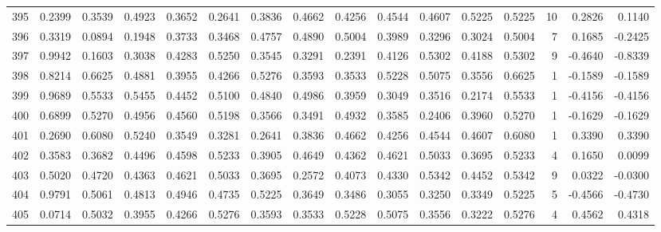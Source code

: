 \begin{tabular}{lrrrrrrrrrrrrrrr}
395 &      0.2399 &  0.3539 &  0.4923 &  0.3652 &  0.2641 &  0.3836 &  0.4662 &  0.4256 &  0.4544 &  0.4607 &   0.5225 &     0.5225 &     10 &                    0.2826 &                     0.1140 \\
396 &      0.3319 &  0.0894 &  0.1948 &  0.3733 &  0.3468 &  0.4757 &  0.4890 &  0.5004 &  0.3989 &  0.3296 &   0.3024 &     0.5004 &      7 &                    0.1685 &                    -0.2425 \\
397 &      0.9942 &  0.1603 &  0.3038 &  0.4283 &  0.5250 &  0.3545 &  0.3291 &  0.2391 &  0.4126 &  0.5302 &   0.4188 &     0.5302 &      9 &                   -0.4640 &                    -0.8339 \\
398 &      0.8214 &  0.6625 &  0.4881 &  0.3955 &  0.4266 &  0.5276 &  0.3593 &  0.3533 &  0.5228 &  0.5075 &   0.3556 &     0.6625 &      1 &                   -0.1589 &                    -0.1589 \\
399 &      0.9689 &  0.5533 &  0.5455 &  0.4452 &  0.5100 &  0.4840 &  0.4986 &  0.3959 &  0.3049 &  0.3516 &   0.2174 &     0.5533 &      1 &                   -0.4156 &                    -0.4156 \\
400 &      0.6899 &  0.5270 &  0.4956 &  0.4560 &  0.5198 &  0.3566 &  0.3491 &  0.4932 &  0.3585 &  0.2406 &   0.3960 &     0.5270 &      1 &                   -0.1629 &                    -0.1629 \\
401 &      0.2690 &  0.6080 &  0.5240 &  0.3549 &  0.3281 &  0.2641 &  0.3836 &  0.4662 &  0.4256 &  0.4544 &   0.4607 &     0.6080 &      1 &                    0.3390 &                     0.3390 \\
402 &      0.3583 &  0.3682 &  0.4496 &  0.4598 &  0.5233 &  0.3905 &  0.4649 &  0.4362 &  0.4621 &  0.5033 &   0.3695 &     0.5233 &      4 &                    0.1650 &                     0.0099 \\
403 &      0.5020 &  0.4720 &  0.4363 &  0.4621 &  0.5033 &  0.3695 &  0.2572 &  0.4073 &  0.4330 &  0.5342 &   0.4452 &     0.5342 &      9 &                    0.0322 &                    -0.0300 \\
404 &      0.9791 &  0.5061 &  0.4813 &  0.4946 &  0.4735 &  0.5225 &  0.3649 &  0.3486 &  0.3055 &  0.3250 &   0.3349 &     0.5225 &      5 &                   -0.4566 &                    -0.4730 \\
405 &      0.0714 &  0.5032 &  0.3955 &  0.4266 &  0.5276 &  0.3593 &  0.3533 &  0.5228 &  0.5075 &  0.3556 &   0.3222 &     0.5276 &      4 &                    0.4562 &                     0.4318 \\

\end{tabular}
